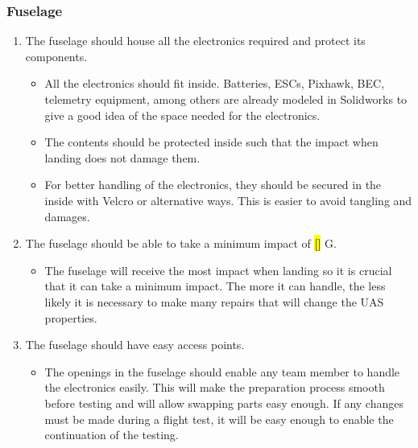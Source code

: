 \documentclass{article}
\begin{document}
\subsubsection{Fuselage}
\begin{enumerate}
  \item{The fuselage should house all the electronics required and protect its components.}
  \begin{itemize}
    \item{All the electronics should fit inside. Batteries, ESCs, Pixhawk, BEC, telemetry equipment, among others are already modeled in Solidworks to give a good idea of the space needed for the electronics.}
    \item{The contents should be protected inside such that the impact when landing does not damage them.}
    \item{For better handling of the electronics, they should be secured in the inside with Velcro or alternative ways. This is easier to avoid tangling and damages.}
  \end{itemize}
  
  \item{The fuselage should be able to take a minimum impact of \hl{[]} G.}
  \begin{itemize}
    \item{The fuselage will receive the most impact when landing so it is crucial that it can take a minimum impact. The more it can handle, the less likely it is necessary to make many repairs that will change the UAS properties.}
  \end{itemize}
  
  \item{The fuselage should have easy access points.}
  \begin{itemize}
    \item{The openings in the fuselage should enable any team member to handle the electronics easily. This will make the preparation process smooth before testing and will allow swapping parts easy enough. If any changes must be made during a flight test, it will be easy enough to enable the continuation of the testing.}
  \end{itemize}

\end{enumerate}
\end{document}
